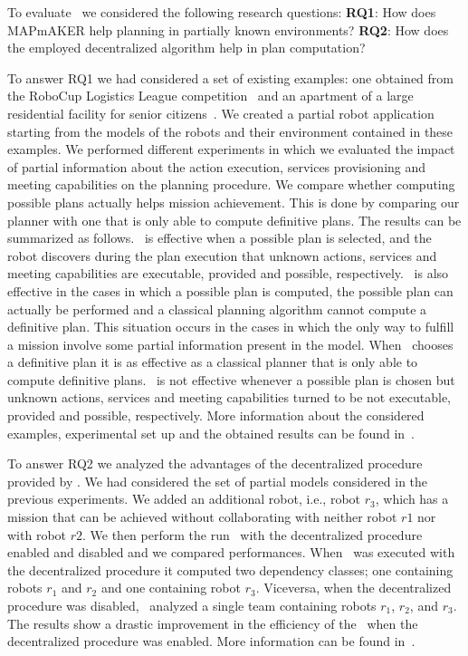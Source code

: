 To evaluate  \toolName\ we considered the following research questions: \textbf{RQ1}: How does MAPmAKER help planning in partially known environments? \textbf{RQ2}: How does the employed decentralized algorithm help in plan computation?

To answer RQ1 we  had considered a set of existing examples:
one obtained from the RoboCup Logistics League competition~\cite{karrasrobocup} and an apartment of a large residential facility for senior citizens~\cite{map}.
We created a partial robot application starting from the models of the robots and their environment contained in these examples.
We performed different experiments in which we evaluated the impact of partial information about the action execution, services provisioning and meeting capabilities on the planning procedure.
We compare whether computing possible plans actually helps mission achievement.
This is done by comparing our planner with one that is only able to compute definitive plans.
The results can be summarized as follows.
\toolName\ is effective when  a possible plan is selected, and the robot discovers during the plan execution 
that unknown actions, services and meeting capabilities are executable, provided and possible, respectively.
\toolName\ is also effective in the cases in which a possible plan  is computed, the possible plan can actually be performed and a classical planning algorithm cannot compute a definitive plan.
This situation occurs in the cases in which the only way to fulfill a mission involve some partial information present in the model.
When \toolName\ chooses a definitive plan it is as effective as a classical planner that is only able to compute definitive plans.
\toolName\ is not effective whenever a possible plan is chosen but  unknown actions, services and meeting capabilities turned to be not executable, provided and possible, respectively.
More information about the considered examples, experimental set up and the obtained results can be found in~\cite{mapmaker17}.

To answer RQ2 we analyzed the advantages of the decentralized procedure provided by \toolName.
We had considered the set of partial models considered in the previous experiments. 
We added an additional robot, i.e., robot $r_3$, which has a mission that can be achieved without collaborating with neither  robot $r1$ nor with robot $r2$. 
We then perform the run \toolName\ with the decentralized procedure enabled and disabled and we compared performances. 
When \toolName\ was executed with the  decentralized procedure it computed two dependency classes; one containing robots $r_1$ and $r_2$ and one containing robot $r_3$. 
Viceversa, when the decentralized procedure was disabled, \toolName\ 
analyzed a single team containing  robots $r_1$, $r_2$, and $r_3$. 
The results show a drastic improvement in the efficiency of the \toolName\ when the decentralized procedure was enabled.
More information can be found in~\cite{mapmaker17}.

